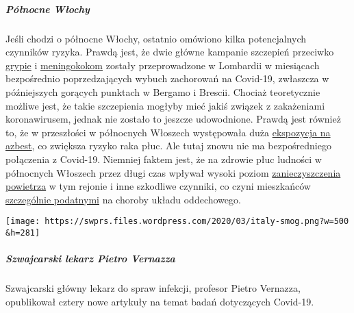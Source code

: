 \hypertarget{puxf3ux142nocne-wux142ochy}{%
\subparagraph{\texorpdfstring{\textbf{Północne
Włochy}}{Północne Włochy}}\label{puxf3ux142nocne-wux142ochy}}

Jeśli chodzi o północne Włochy, ostatnio omówiono kilka potencjalnych
czynników ryzyka. Prawdą jest, że dwie główne kampanie szczepień
przeciwko
\href{https://www.bergamonews.it/2019/10/21/vaccinazione-antinfluenzale-a-bergamo-ordinate-185-000-dosi-di-vaccino/332164/}{grypie}
i
\href{https://www.bsnews.it/2020/01/18/meningite-vaccinate-34mila-persone-tra-brescia-e-bergamo/}{meningokokom}
zostały przeprowadzone w Lombardii w miesiącach bezpośrednio
poprzedzających wybuch zachorowań na Covid-19, zwłaszcza w późniejszych
gorących punktach w Bergamo i Brescii. Chociaż teoretycznie możliwe
jest, że takie szczepienia mogłyby mieć jakiś związek z zakażeniami
koronawirusem, jednak nie zostało to jeszcze udowodnione. Prawdą jest
również to, że w przeszłości w północnych Włoszech występowała duża
\href{https://www.spiegel.de/panorama/justiz/asbest-prozess-in-italien-nun-sind-alle-krank-a-666421.html}{ekspozycja
na azbest}, co zwiększa ryzyko raka płuc. Ale tutaj znowu nie ma
bezpośredniego połączenia z Covid-19. Niemniej faktem jest, że na
zdrowie płuc ludności w północnych Włoszech przez długi czas wpływał
wysoki poziom
\href{https://twitter.com/esa/status/1238480433047916545}{zanieczyszczenia
powietrza} w tym rejonie i inne szkodliwe czynniki, co czyni mieszkańców
\href{https://www.thelocal.it/20170131/our-lungs-are-breaking-smog-levels-way-above-safe-limits-in-northern-italy}{szczególnie
podatn}\href{https://www.thelocal.it/20170131/our-lungs-are-breaking-smog-levels-way-above-safe-limits-in-northern-italy}{ymi}
na choroby układu oddechowego.

\texttt{[image: https://swprs.files.wordpress.com/2020/03/italy-smog.png?w=500\\\&h=281]}

\hypertarget{szwajcarski-lekarz-pietro-vernazza}{%
\subparagraph{\texorpdfstring{\textbf{Szwajcarski lekarz Pietro
Vernazza}}{Szwajcarski lekarz Pietro Vernazza}}\label{szwajcarski-lekarz-pietro-vernazza}}

Szwajcarski główny lekarz do spraw infekcji, profesor Pietro Vernazza,
opublikował cztery nowe artykuły na temat badań dotyczących Covid-19.

